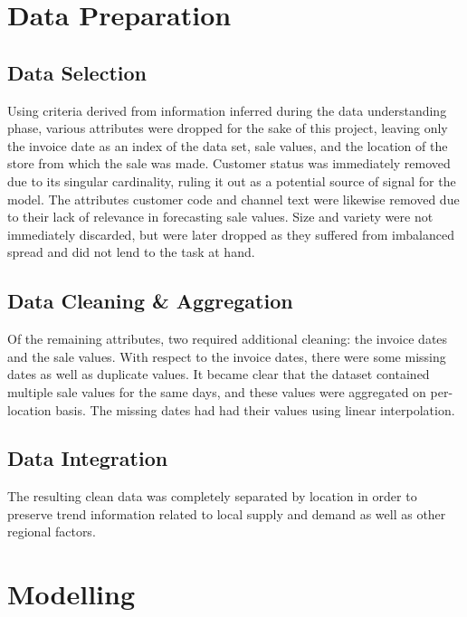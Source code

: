 \documentclass{article}
\begin{document}
        
\section{Data Preparation}
    \subsection{Data Selection}
        Using criteria derived from information inferred during the data understanding phase,
        various attributes were dropped for the sake of this project, leaving only the invoice
        date as an index of the data set, sale values, and the location of the store from which
        the sale was made. Customer status was immediately removed due to its singular
        cardinality, ruling it out as a potential source of signal for the model. The attributes
        customer code and channel text were likewise removed due to their lack of relevance in
        forecasting sale values. Size and variety were not immediately discarded, but were later
        dropped as they suffered from imbalanced spread and did not lend to the task at hand.
    \subsection{Data Cleaning \& Aggregation}
        Of the remaining attributes, two required additional cleaning: the invoice dates and the
        sale values. With respect to the invoice dates, there were some missing dates as well as
        duplicate values. It became clear that the dataset contained multiple sale values for the
        same days, and these values were aggregated on per-location basis. The missing dates had
        had their values using linear interpolation.
    \subsection{Data Integration}
        The resulting clean data was completely separated by location in order to preserve trend
        information related to local supply and demand as well as other regional factors.


\section{Modelling}
\end{document}
